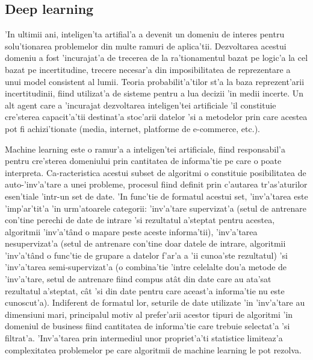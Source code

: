 \documentclass[12pt,a4paper,twoside]{report}
\begin{document}
\subsection{Deep learning}
'In ultimii ani, inteligen'ta artifial'a a devenit un domeniu de interes pentru solu'tionarea problemelor din multe ramuri de aplica'tii.  Dezvoltarea acestui domeniu a fost 'incurajat'a de trecerea de la ra'tionamentul bazat pe logic'a la cel bazat pe incertitudine,  trecere necesar'a din imposibilitatea de reprezentare a unui model consistent al lumii.  Teoria probabilit'a'tilor st'a la baza reprezent'arii incertitudinii, fiind utilizat'a de sisteme pentru a lua decizii 'in medii incerte. Un alt agent care a 'incurajat dezvoltarea inteligen'tei artificiale 'il constituie cre'sterea capacit'a'tii destinat'a stoc'arii datelor 'si a metodelor prin care acestea pot fi achizi'tionate (media, internet, platforme de e-commerce, etc.).

Machine learning este o ramur'a a inteligen'tei artificiale,  fiind responsabil'a pentru cre'sterea domeniului prin cantitatea de informa'tie pe care o poate interpreta. Ca-racteristica acestui subset de algoritmi o constituie posibilitatea de auto-'inv'a'tare a unei probleme, procesul fiind definit prin c'autarea tr'as'aturilor esen'tiale 'intr-un set de date. 'In func'tie de formatul acestui set, 'inv'a'tarea este 'imp'ar'tit'a 'in urm'atoarele categorii: 'inv'a'tare supervizat'a (setul de antrenare con'tine perechi de date de intrare 'si rezultatul a'steptat pentru acestea, algoritmii 'inv'a't\^and o mapare peste aceste informa'tii), 'inv'a'tarea nesupervizat'a (setul de antrenare con'tine doar datele de intrare, algoritmii 'inv'a't\^and o func'tie de grupare a datelor f'ar'a a 'ii cunoa'ste rezultatul) 'si 'inv'a'tarea semi-supervizat'a (o combina'tie 'intre celelalte dou'a metode de 'inv'a'tare, setul de antrenare fiind compus at\^at din date care au ata'sat rezultatul a'steptat, c\^at 'si din date pentru care aceast'a informa'tie nu este cunoscut'a). Indiferent de formatul lor, seturile de date utilizate 'in 'inv'a'tare au dimensiuni mari, principalul motiv al prefer'arii acestor tipuri de algoritmi 'in domeniul de business fiind cantitatea de informa'tie care trebuie selectat'a 'si filtrat'a. 'Inv'a'tarea prin intermediul unor propriet'a'ti statistice limiteaz'a complexitatea problemelor pe care algoritmii de machine learning le pot rezolva. 
\end{document}
